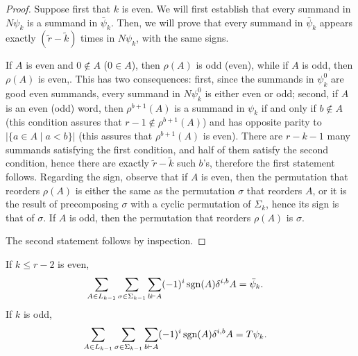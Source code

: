 \begin{proof}
	Suppose first that $k$ is even. We will first establish that every summand in $N\psi_k$ is a summand in $\bar{\psi}_k$. Then, we will prove that every summand in $\bar{\psi}_k$ appears exactly $(\tilde{r}-\tilde{k})$ times in $N\psi_k$, with the same signs.

	If $A$ is even and $0\notin A$ ($0\in A$), then $\rho(A)$ is odd (even), while if $A$ is odd, then $\rho(A)$ is even,. This has two consequences: first, since the summands in $\psi_k^0$ are good even summands, every summand in $N\psi_k^0$ is either even or odd; second, if $A$ is an even (odd) word, then $\rho^{b+1}(A)$ is a summand in $\psi_k$ if and only if $b\notin A$ (this condition assures that $r-1\notin \rho^{b+1}(A)$) and has opposite parity to $|\{a\in A\mid a<b\}|$ (this assures that $\rho^{b+1}(A)$ is even). There are $r-k-1$ many summands satisfying the first condition, and half of them satisfy the second condition, hence there are exactly $\tilde{r}-\tilde{k}$ such $b$'s, therefore the first statement follows. Regarding the sign, observe that if $A$ is even, then the permutation that reorders $\rho(A)$ is either the same as the permutation $\sigma$ that reorders $A$, or it is the result of precomposing $\sigma$ with a cyclic permutation of $\Sigma_k$, hence its sign is that of $\sigma$. If $A$ is odd, then the permutation that reorders $\rho(A)$ is $\sigma$.

	The second statement follows by inspection.
\end{proof}

\begin{lemma} \label{lemma:pair}
	If $k\leq r-2$ is even,
	\begin{align*}
		\sum_{A\in L_{k-1}}\sum_{\sigma\in \Sigma_{k-1}}\sum_{b\vdash A}(-1)^i\operatorname*{sgn}(A)\delta^{i,b}A &= \bar{\psi}_k.
	\end{align*}
	If $k$ is odd,
	\begin{align*}
		\sum_{A\in L_{k-1}}\sum_{\sigma\in \Sigma_{k-1}}\sum_{b\vdash A}(-1)^i\operatorname*{sgn}(A)\delta^{i,b}A &= T\psi_k.
	\end{align*}
\end{lemma}

